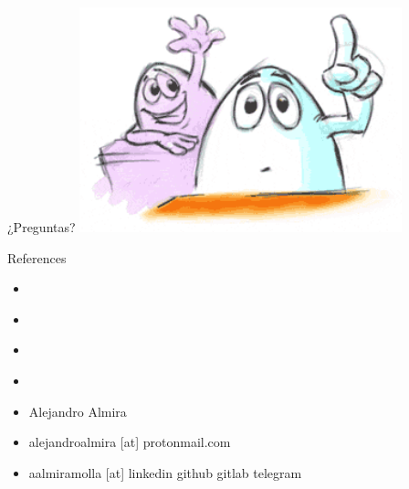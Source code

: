 \documentclass[14pt]{beamer}
\newcommand{\WebLink}[2]{
  \href{#1}{\structure{\PointingHand\color{sail-green}{#2}}}
}
\begin{document}
\section{}
\begin{frame}
  \centering
  \Huge{¿Preguntas?}
  \includegraphics[width=0.7\textwidth]{preguntas.png}
\end{frame}

\begin{frame}{References}
    \centering
      \begin{itemize}
          \item \WebLink{https://graphql.org/}{GraphQL Official Page (graphql.org)} 
          \item \WebLink{https://www.howtographql.com/}{The Fullstack tutorial for GraphQL (howtographql.com)}
          \item \WebLink{https://graphene-python.org/}{Graphene-Python (graphene-python.com)}
          \item \WebLink{https://docs.graphene-python.org/projects/django/en/latest/}{Graphene-Django (https://docs.graphene-python.org/projects/django/en/latest/)}
      \end{itemize}
\end{frame}

\begin{frame}
    \centering
      \begin{itemize}
        \item Alejandro Almira
        \item alejandroalmira [at] protonmail.com
        \item aalmiramolla [at] linkedin github gitlab telegram
      \end{itemize}
\end{frame}
\end{document}
